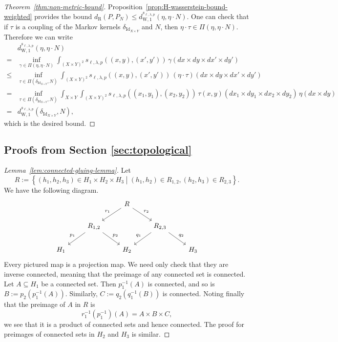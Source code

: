 \documentclass[twoside,11pt]{article}
\DeclareMathOperator{\id}{Id}
\newcommand{\dexp}[1][]{d_{\mathrm{R}#1}}
\newcommand{\set}[2]{\left\{ #1\middle| #2\right\}}
\newcommand{\dWp}[1]{d_{\mathrm{W},#1}}
\newcommand{\dW}{\dWp 1}
\newcommand{\dWkernp}[1]{d_{\mathrm{W},#1}}
\newcommand{\dWkern}{\dWkernp{1}}
\begin{document}
\begin{proof}[Theorem~\ref{thm:non-metric-bound}]
    Proposition~\ref{prop:H-wasserstein-bound-weighted} provides the bound $\dexp(P,P_N)\leq \dW^{s_{\ell,\lambda,p}}(\eta,\eta \cdot N)$.
    One can check that if $\tau$ is a coupling of the Markov kernels $\delta_{\id_{X\times Y}}$ and $N$, then $\eta\cdot \tau \in \Pi(\eta,\eta\cdot N)$. Therefore we can write
    \begin{align*}
        &\dW^{s_{\ell,\lambda,p}}(\eta,\eta \cdot N)
        \\ = & 
        \inf_{\gamma\in \Pi(\eta,\eta\cdot N)}
        \int_{(X\times Y)^2}
        s_{\ell,\lambda,p}((x,y),(x',y')) \,
        \gamma(dx{\times} dy {\times} dx' {\times} dy')
        \\ \leq & 
        \inf_{\tau\in \Pi(\delta_{\id_{X\times Y}},N)}
        \int_{(X\times Y)^2}
        s_{\ell,\lambda,p}((x,y),(x',y')) \,
        (\eta\cdot \tau)(dx{\times} dy {\times} dx' {\times} dy')
        \\ = &
        \inf_{\tau\in \Pi(\delta_{\id_{X\times Y}},N)}
        \int_{X\times Y}\int_{(X\times Y)^2}
        s_{\ell,\lambda,p}((x_1,y_1),(x_2,y_2)) \,
        \tau(x,y)(dx_1{\times} dy_1 {\times} dx_2 {\times} dy_2) \, \eta(dx{\times} dy)
        \\ = & \dWkern^{s_{\ell,\lambda,p}}(\delta_{\id_{X\times Y}},N),
    \end{align*}
    which is the desired bound.
\end{proof}


\subsection{Proofs from Section \ref{sec:topological}}
\begin{proof}[Lemma~\ref{lem:connected-gluing-lemma}]
    Let
    \[R := \set{(h_1,h_2,h_3)\in H_1{\times} H_2{\times} H_3}{(h_1,h_2) \in R_{1,2}, (h_2,h_3)\in R_{2,3}}.\]
    We have the following diagram.
    \[
    \begin{tikzcd}
    &&R\ar[dl,"r_1",swap] \ar[dr,"r_2"] \\
    &R_{1,2} \ar[dl,"p_1",swap] \ar[dr,"p_2"] && R_{2,3}\ar[dl,"q_1",swap] \ar[dr,"q_2"] \\
    H_1 && H_2 && H_3
    \end{tikzcd}  
    \]
    Every pictured map is a projection map. We need only check that they are inverse connected, meaning that the preimage of any connected set is connected. Let $A\subseteq H_1$ be a connected set. Then $p_1^{-1}(A)$ is connected, and so is $B:=  p_2(p_1^{-1}(A))$. Similarly, $C:=  q_2(q_1^{-1}(B))$ is connected. Noting finally that the preimage of $A$ in $R$ is
    \[r_1^{-1}(p_1^{-1})(A) = A\times B \times C,\]
    we see that it is a product of connected sets and hence connected. The proof for preimages of connected sets in $H_2$ and $H_3$ is similar.
\end{proof}
\end{document}
